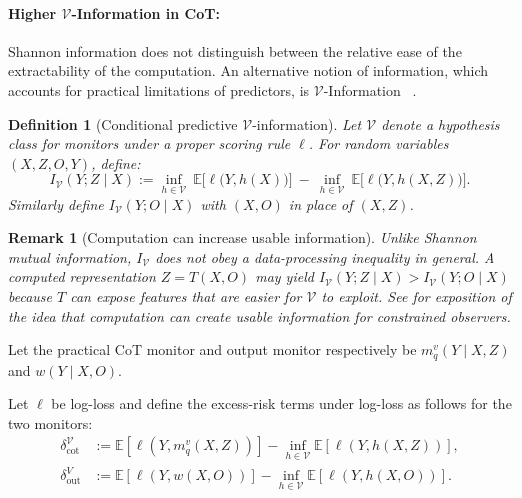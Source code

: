 \documentclass{article}
\theoremstyle{plain}
\newtheorem{definition}[theorem]{Definition}
\newtheorem{remark}[theorem]{Remark}
\def\E{\mathbb{E}}
\newcommand{\V}{\mathcal{V}}
\newcommand{\IV}{I_\mathcal{V}}
\begin{document}
\paragraph{Higher $\V$-Information in CoT:}
Shannon information does not distinguish between the relative ease of the extractability of the computation.
An alternative notion of information, which accounts for practical limitations of predictors, is $\V$-Information ~\citet{xu2020usable}.

\begin{definition}[Conditional predictive $\V$-information]
Let $\V$ denote a hypothesis class for monitors under a proper scoring rule $\ell$. For random variables $(X,Z,O,Y)$, define:
\[
\IV(Y;Z\mid X)
:= \inf_{h\in\V}\ \E\big[\ell\big(Y,h(X)\big)\big]
 \ -\ \inf_{h\in\V}\ \E\big[\ell\big(Y,h(X,Z)\big)\big].
\]
Similarly define $\IV(Y;O\mid X)$ with $(X,O)$ in place of $(X,Z)$.
\end{definition}

\begin{remark}[Computation can increase usable information]
Unlike Shannon mutual information, $\IV$ does \emph{not} obey a data-processing inequality in general.
A computed representation $Z=T(X,O)$ may yield $\IV(Y;Z\mid X)>\IV(Y;O\mid X)$ because $T$ can expose features that are easier for $\V$ to exploit. 
See \citet{xu2020usable} for exposition of the idea that computation can create \emph{usable} information for constrained observers.
\end{remark}

Let the practical CoT monitor and output monitor respectively be $m_{q}^{v}(Y\mid X,Z)$ and $w(Y\mid X,O)$.

Let $\ell$ be log-loss and define the excess-risk terms under log-loss as follows for the two monitors:
\begin{align*}
\delta^\V_{\text{cot}}&:=\E\!\left[\ell\!\left(Y, m_{q}^{v}(X,Z)\right)\right]
-\inf_{h\in\V}\E\!\left[\ell\!\left(Y,h(X,Z)\right)\right],\\
\delta^V_{\text{out}}&:=\E\!\left[\ell\!\left(Y, w(X,O)\right)\right]
-\inf_{h\in\V}\E\!\left[\ell\!\left(Y,h(X,O)\right)\right].
\end{align*}
\end{document}
